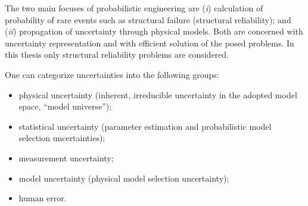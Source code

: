 %
%

The two main focuses of probabilistic engineering are (\textit{i}) calculation of probability of rare events such as structural failure (structural reliability); and (\textit{ii}) propagation of uncertainty through physical models. Both are concerned with uncertainty representation and with efficient solution of the posed problems. In this thesis only structural reliability problems are considered.

One can categorize uncertainties into the following groups:
\begin{itemize}
	\item physical uncertainty (inherent, irreducible uncertainty in the adopted model space, ``model universe'');
	\item statistical uncertainty (parameter estimation and probabilistic model selection uncertainties);
	\item measurement uncertainty;
	\item model uncertainty (physical model selection uncertainty);
	\item human error.
\end{itemize}

